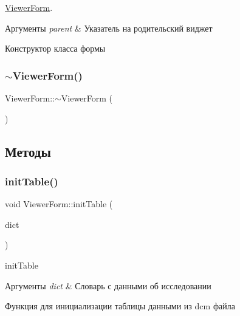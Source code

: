 \hyperlink{classViewerForm}{Viewer\+Form}. 


\begin{DoxyParams}{Аргументы}
{\em parent} & Указатель на родительский виджет\\
\hline
\end{DoxyParams}
Конструктор класса формы \mbox{\label{classViewerForm_ac75f02831e65d75ef9b9843d9a180ee4}} 
\subsubsection{\texorpdfstring{$\sim$\+Viewer\+Form()}{~ViewerForm()}}
{\footnotesize\ttfamily Viewer\+Form\+::$\sim$\+Viewer\+Form (\begin{DoxyParamCaption}{ }\end{DoxyParamCaption})}



\subsection{Методы}
\mbox{\label{classViewerForm_a2c109da65b355c5e9712a148b01ee7f3}} 
\subsubsection{\texorpdfstring{init\+Table()}{initTable()}}
{\footnotesize\ttfamily void Viewer\+Form\+::init\+Table (\begin{DoxyParamCaption}\item[{const \hyperlink{tagshelpers_8h_ae25d30658f61420b88a380dc9e40bb74}{dicom\+Dict} \&}]{dict }\end{DoxyParamCaption})\hspace{0.3cm}{\ttfamily [private]}}



init\+Table 


\begin{DoxyParams}{Аргументы}
{\em dict} & Словарь с данными об исследовании\\
\hline
\end{DoxyParams}
Функция для инициализации таблицы данными из dcm файла \mbox{\label{classViewerForm_a298b0181b562b7521e62212db1976cdd}} 
